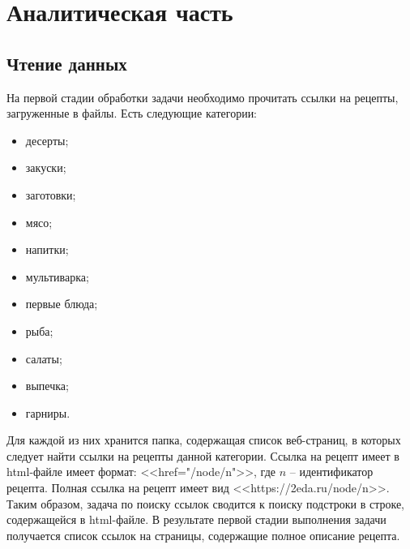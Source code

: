 \chapter{Аналитическая часть}

\section{Чтение данных}
На первой стадии обработки задачи необходимо прочитать ссылки на рецепты, загруженные в файлы.
Есть следующие категории:
\begin{itemize}
    \item десерты;
    \item закуски;
    \item заготовки;
    \item мясо;
    \item напитки;
    \item мультиварка;
    \item первые блюда;
    \item рыба;
    \item салаты;
    \item выпечка;
    \item гарниры.
\end{itemize}
Для каждой из них хранится папка, содержащая список веб-страниц, в которых следует найти ссылки на рецепты данной категории.
Ссылка на рецепт имеет в html-файле имеет формат: <<href="/node/n">>, где $n$ -- идентификатор рецепта.
Полная ссылка на рецепт имеет вид <<https://2eda.ru/node/n>>.
Таким образом, задача по поиску ссылок сводится к поиску подстроки в строке, содержащейся в html-файле.
В результате первой стадии выполнения задачи получается список ссылок на страницы, содержащие полное описание рецепта.

